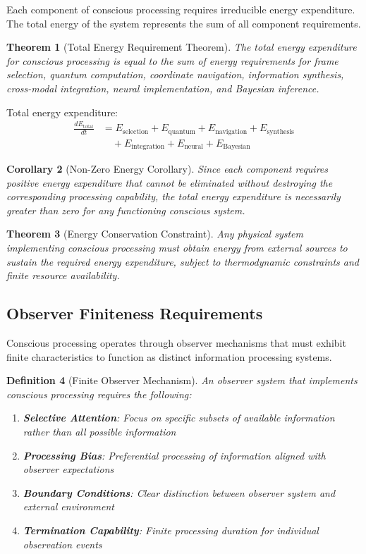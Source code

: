 \documentclass[12pt,a4paper]{article}
\newtheorem{theorem}{Theorem}[section]
\newtheorem{corollary}[theorem]{Corollary}
\newtheorem{definition}[theorem]{Definition}
\begin{document}
Each component of conscious processing requires irreducible energy expenditure. The total energy of the system represents the sum of all component requirements.

\begin{theorem}[Total Energy Requirement Theorem]
The total energy expenditure for conscious processing is equal to the sum of energy requirements for frame selection, quantum computation, coordinate navigation, information synthesis, cross-modal integration, neural implementation, and Bayesian inference.
\end{theorem}

Total energy expenditure:
\begin{align}
\frac{dE_{\text{total}}}{dt} &= E_{\text{selection}} + E_{\text{quantum}} + E_{\text{navigation}} + E_{\text{synthesis}} \\
&\quad + E_{\text{integration}} + E_{\text{neural}} + E_{\text{Bayesian}}
\end{align}

\begin{corollary}[Non-Zero Energy Corollary]
Since each component requires positive energy expenditure that cannot be eliminated without destroying the corresponding processing capability, the total energy expenditure is necessarily greater than zero for any functioning conscious system.
\end{corollary}

\begin{theorem}[Energy Conservation Constraint]
Any physical system implementing conscious processing must obtain energy from external sources to sustain the required energy expenditure, subject to thermodynamic constraints and finite resource availability.
\end{theorem}

\subsection{Observer Finiteness Requirements}

Conscious processing operates through observer mechanisms that must exhibit finite characteristics to function as distinct information processing systems.

\begin{definition}[Finite Observer Mechanism]
An observer system that implements conscious processing requires the following:
\begin{enumerate}
\item \textbf{Selective Attention}: Focus on specific subsets of available information rather than all possible information
\item \textbf{Processing Bias}: Preferential processing of information aligned with observer expectations
\item \textbf{Boundary Conditions}: Clear distinction between observer system and external environment
\item \textbf{Termination Capability}: Finite processing duration for individual observation events
\end{enumerate}
\end{definition}
\end{document}

